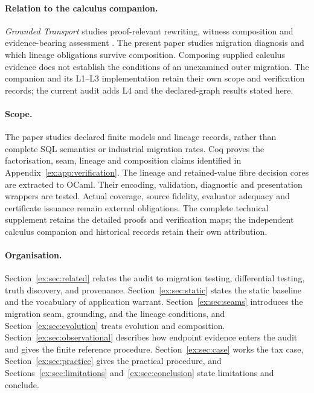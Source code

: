 \documentclass[smallextended,envcountsect,envcountsame,natbib]{svjour3}
\begin{document}
\paragraph{Relation to the calculus companion.} \emph{Grounded Transport} studies proof-relevant rewriting, witness composition and evidence-bearing assessment \citep{moore2026transport}. The present paper studies migration diagnosis and which lineage obligations survive composition. Composing supplied calculus evidence does not establish the conditions of an unexamined outer migration. The companion and its L1--L3 implementation retain their own scope and verification records; the current audit adds L4 and the declared-graph results stated here.

\paragraph{Scope.} The paper studies declared finite models and lineage records, rather than complete SQL semantics or industrial migration rates. Coq proves the factorisation, seam, lineage and composition claims identified in Appendix~\ref{ex:app:verification}. The lineage and retained-value fibre decision cores are extracted to OCaml. Their encoding, validation, diagnostic and presentation wrappers are tested. Actual coverage, source fidelity, evaluator adequacy and certificate issuance remain external obligations. The complete technical supplement retains the detailed proofs and verification maps; the independent calculus companion and historical records retain their own attribution.

\paragraph{Organisation.} Section~\ref{ex:sec:related} relates the audit to migration testing, differential testing, truth discovery, and provenance. Section~\ref{ex:sec:static} states the static baseline and the vocabulary of application warrant. Section~\ref{ex:sec:seams} introduces the migration seam, grounding, and the lineage conditions, and Section~\ref{ex:sec:evolution} treats evolution and composition. Section~\ref{ex:sec:observational} describes how endpoint evidence enters the audit and gives the finite reference procedure. Section~\ref{ex:sec:case} works the tax case, Section~\ref{ex:sec:practice} gives the practical procedure, and Sections~\ref{ex:sec:limitations} and~\ref{ex:sec:conclusion} state limitations and conclude.
\end{document}
